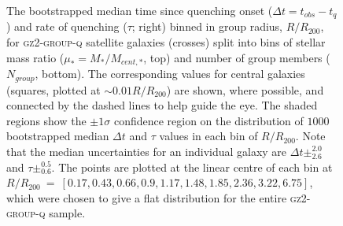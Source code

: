 \documentclass[useAMS,usenatbib]{mn2e}
\begin{document}
\begin{figure}
{\caption[Trend of $\Delta t$ and $\tau$ with group radius split by number in group and stellar mass ratio]{The bootstrapped median time since quenching onset ($\Delta t = t_{obs} - t_{q}$) and rate of quenching ($\tau$; right) binned in group radius, $R/R_{200}$, for \textsc{gz2-group-q} satellite galaxies (crosses) split into bins of stellar mass ratio ($\mu_* = M_*/M_{cent,*}$, top) and number of group members ($N_{group}$, bottom). The corresponding values for central galaxies (squares, plotted at $\sim0.01 R/R_{200}$) are shown, where possible, and connected by the dashed lines to help guide the eye. The shaded regions show the $\pm1\sigma$ confidence region on the distribution of $1000$ bootstrapped median $\Delta t$ and $\tau$ values in each bin of $R/R_{200}$. Note that the median uncertainties for an individual galaxy are $\Delta t\pm_{2.6}^{2.0}$ and $\tau\pm_{0.6}^{0.5}$. The points are plotted at the linear centre of each bin at $R/R_{200}~=~ [0.17,  0.43,  0.66,  0.9 ,  1.17,  1.48,  1.85,  2.36,  3.22,  6.75]$, which were chosen to give a flat distribution for the entire \textsc{gz2-group-q} sample.}
\label{fig:timesinceradiusmu}}
\end{figure}
\end{document}
